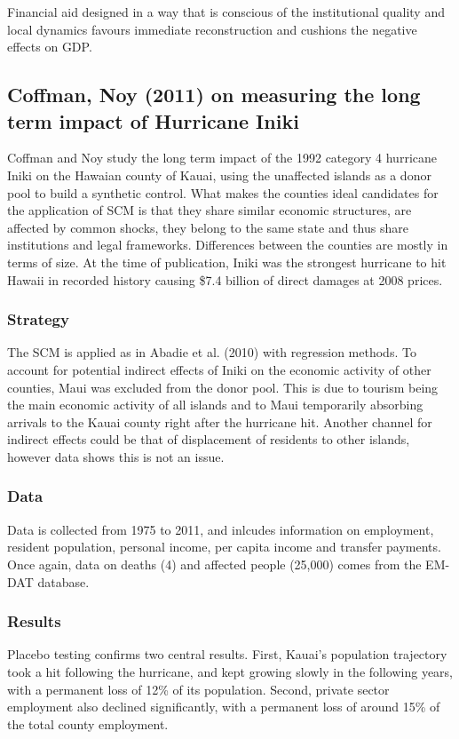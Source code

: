 \documentclass[12pt,a4paper,draft]{article}
\begin{document}
Financial aid designed in a way that is conscious of the institutional quality and local dynamics 
favours immediate reconstruction and cushions the negative effects on GDP.



\subsection{Coffman, Noy (2011) on measuring the long term impact of Hurricane Iniki}
Coffman and Noy study the long term impact of the 1992 category 4 hurricane Iniki on 
the Hawaian county of Kauai, using the unaffected islands as a donor pool to build 
a synthetic control. 
What makes the counties ideal candidates for the application of SCM is that they share 
similar economic structures, are affected by common shocks, they belong to the same 
state and thus share institutions and legal frameworks. 
Differences between the counties are mostly in terms of size.
At the time of publication, Iniki was the strongest hurricane to hit Hawaii in recorded 
history causing \$7.4 billion of direct damages at 2008 prices.

\subsubsection*{Strategy}
The SCM is applied as in Abadie et al. (2010) with regression methods. %
To account for potential indirect effects of Iniki on the economic activity of other 
counties, Maui was excluded from the donor pool. This is due to tourism being the 
main economic activity of all islands and to Maui temporarily absorbing arrivals to 
the Kauai county right after the hurricane hit. 
Another channel for indirect effects could be that of displacement of residents to 
other islands, however data shows this is not an issue. 

\subsubsection*{Data}
Data is collected from 1975 to 2011, and inlcudes information on employment, resident 
population, personal income, per capita income and transfer payments.  
Once again, data on deaths (4) and affected people (25,000) comes from the EM-DAT 
database.

\subsubsection*{Results}
Placebo testing confirms two central results. 
First, Kauai's population trajectory took a hit following the hurricane, and kept 
growing slowly in the following years, with a permanent loss of 12\% of its population.
Second, private sector employment also declined significantly, with a permanent loss 
of around 15\% of the total county employment. 
\end{document}
